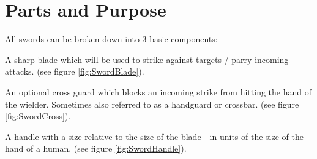 \documentclass{article}
\begin{document}
\pagebreak

\section{Parts and Purpose}
All swords can be broken down into 3 basic components:
\begin{list}{-}{}
    \item A sharp blade which will be used to strike against targets / parry incoming attacks. (see figure \ref{fig:SwordBlade}).
    \item An optional cross guard which blocks an incoming strike from hitting the hand of the wielder. Sometimes also referred to as a handguard or crossbar. (see figure \ref{fig:SwordCross}).
    \item A handle with a size relative to the size of the blade - in units of the size of the hand of a human. (see figure \ref{fig:SwordHandle}).
\end{list}
\end{document}
